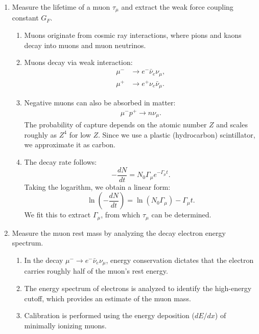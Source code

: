\documentclass[aps,prb,onecolumn,11pt,superscriptaddress,floatfix,longbibliography]{revtex4-2}
\begin{document}
\begin{enumerate}
    \item Measure the lifetime of a muon \(\tau_\mu\) and extract the weak force coupling constant \(G_F\).
    \begin{enumerate}
        \item Muons originate from cosmic ray interactions, where pions and kaons decay into muons and muon neutrinos.
        \item Muons decay via weak interaction: 
        \begin{align*}
            \mu^- &\to e^- \bar{\nu}_e \nu_\mu, \\
            \mu^+ &\to e^+ \nu_e \bar{\nu}_\mu.
        \end{align*}
        \item Negative muons can also be absorbed in matter: 
        \begin{align*}
            \mu^- p^+ \to n \nu_\mu.
        \end{align*}
        The probability of capture depends on the atomic number \(Z\) and scales roughly as \(Z^4\) for low \(Z\). Since we use a plastic (hydrocarbon) scintillator, we approximate it as carbon.
        \item The decay rate follows:  
        \[
        -\frac{dN}{dt} = N_0 \Gamma_\mu e^{-\Gamma_\mu t}.
        \]
        Taking the logarithm, we obtain a linear form:  
        \[
        \ln\left(-\frac{dN}{dt}\right) = \ln(N_0 \Gamma_\mu) - \Gamma_\mu t.
        \]
        We fit this to extract \(\Gamma_\mu\), from which \(\tau_\mu\) can be determined.
    \end{enumerate}
    
    \item Measure the muon rest mass by analyzing the decay electron energy spectrum.
    \begin{enumerate}
        \item In the decay \(\mu^- \to e^- \bar{\nu}_e \nu_\mu\), energy conservation dictates that the electron carries roughly half of the muon's rest energy.
        \item The energy spectrum of electrons is analyzed to identify the high-energy cutoff, which provides an estimate of the muon mass.
        \item Calibration is performed using the energy deposition (\(dE/dx\)) of minimally ionizing muons.
    \end{enumerate}
\end{enumerate}
\end{document}

